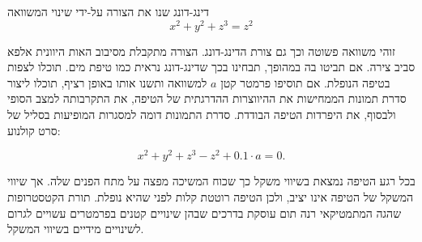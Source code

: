 \begin{surferPage}{דינג-דונג}
שנו את הצורה על-ידי שינוי המשוואה\\

\smallskip
\[x^2	+ y^2	+ z^3	= z^2\]

\singlespacing
זוהי משוואה פשוטה וכך גם צורת הדינג-דונג. הצורה מתקבלת מסיבוב האות היוונית אלפא סביב צירה. אם תביטו בה במהופך, תבחינו בכך שדינג-דונג נראית כמו טיפת מים. תוכלו לצפות בטיפה הנופלת.
\newline
אם תוסיפו פרמטר קטן $a$ למשוואה ותשנו אותו באופן רציף, תוכלו ליצור סדרת תמונות הממחישות את ההיווצרות ההדרגתית של הטיפה, את התקרבותה למצב הסופי ולבסוף, את היפרדות הטיפה הבודדת. סדרת התמונות דומה למסגרות המופיעות בסליל של סרט קולנוע:

\[x^2	+ y^2	+ z^3	-z^2+0.1\cdot a=0.\]

בכל רגע הטיפה נמצאת בשיווי משקל כך שכוח המשיכה מפצה על מתח הפנים שלה. אך שיווי המשקל של הטיפה אינו יציב, ולכן הטיפה רוטטת קלות לפני שהיא נופלת. תורת הקטסטרופות שהגה המתמטיקאי רנה תום עוסקת בדרכים שבהן שינויים קטנים בפרמטרים עשויים לגרום לשינויים מידיים בשיווי המשקל.
\end{surferPage}
